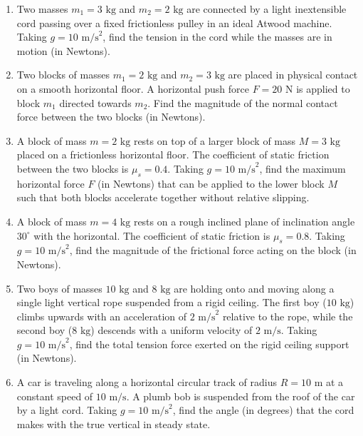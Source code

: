 \documentclass[11pt,a4paper]{article}
\begin{document}
\begin{enumerate}[label=\textbf{\arabic*.},leftmargin=18pt,itemsep=10pt,resume]

  \item Two masses $m_1 = 3\text{ kg}$ and $m_2 = 2\text{ kg}$ are connected by a light inextensible cord passing over a fixed frictionless pulley in an ideal Atwood machine. Taking $g = 10\text{ m/s}^2$, find the tension in the cord while the masses are in motion (in Newtons).

  \item Two blocks of masses $m_1 = 2\text{ kg}$ and $m_2 = 3\text{ kg}$ are placed in physical contact on a smooth horizontal floor. A horizontal push force $F = 20\text{ N}$ is applied to block $m_1$ directed towards $m_2$. Find the magnitude of the normal contact force between the two blocks (in Newtons).

  \item A block of mass $m = 2\text{ kg}$ rests on top of a larger block of mass $M = 3\text{ kg}$ placed on a frictionless horizontal floor. The coefficient of static friction between the two blocks is $\mu_s = 0.4$. Taking $g = 10\text{ m/s}^2$, find the maximum horizontal force $F$ (in Newtons) that can be applied to the lower block $M$ such that both blocks accelerate together without relative slipping.

  \item A block of mass $m = 4\text{ kg}$ rests on a rough inclined plane of inclination angle $30^\circ$ with the horizontal. The coefficient of static friction is $\mu_s = 0.8$. Taking $g = 10\text{ m/s}^2$, find the magnitude of the frictional force acting on the block (in Newtons).

  \item Two boys of masses $10\text{ kg}$ and $8\text{ kg}$ are holding onto and moving along a single light vertical rope suspended from a rigid ceiling. The first boy ($10\text{ kg}$) climbs upwards with an acceleration of $2\text{ m/s}^2$ relative to the rope, while the second boy ($8\text{ kg}$) descends with a uniform velocity of $2\text{ m/s}$. Taking $g = 10\text{ m/s}^2$, find the total tension force exerted on the rigid ceiling support (in Newtons).

  \item A car is traveling along a horizontal circular track of radius $R = 10\text{ m}$ at a constant speed of $10\text{ m/s}$. A plumb bob is suspended from the roof of the car by a light cord. Taking $g = 10\text{ m/s}^2$, find the angle (in degrees) that the cord makes with the true vertical in steady state.

\end{enumerate}
\newpage
\end{document}
